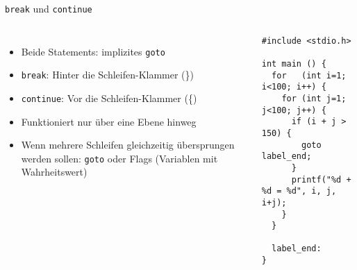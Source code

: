 \begin{frame}[fragile]{\texttt{break} und \texttt{continue}}
%
\begin{columns}[T]
\begin{itemize}
\item Beide Statements: implizites \texttt{goto}
\item \texttt{break}: Hinter die Schleifen-Klammer (\})
\item \texttt{continue}: Vor die Schleifen-Klammer (\{)
\item Funktioniert nur über eine Ebene hinweg
\item Wenn mehrere Schleifen gleichzeitig übersprungen werden sollen: \texttt{goto} oder Flags
	(Variablen mit Wahrheitswert)
\end{itemize}
%
\begin{codebox}
\begin{verbatim}
#include <stdio.h>

int main () {
  for   (int i=1; i<100; i++) {
    for (int j=1; j<100; j++) {
      if (i + j > 150) {
        goto label_end;
      }
      printf("%d + %d = %d", i, j, i+j);
    }
  }
  
  label_end:
}
\end{verbatim}
\end{codebox}
%
\end{columns}
%
\end{frame}


